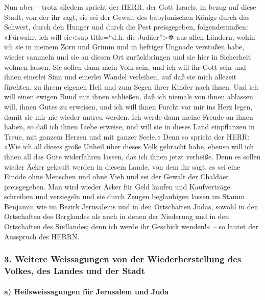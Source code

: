 Nun aber -- trotz alledem spricht der HERR, der Gott
Israels, in bezug auf diese Stadt, von der ihr sagt, sie sei der Gewalt
des babylonischen Königs durch das Schwert, durch den Hunger und durch
die Pest preisgegeben, folgendermaßen: »Fürwahr, ich will
sie\textless sup title=``d.h. die Judäer''\textgreater✲ aus allen
Ländern, wohin ich sie in meinem Zorn und Grimm und in heftiger Ungnade
verstoßen habe, wieder sammeln und sie an diesen Ort zurückbringen und
sie hier in Sicherheit wohnen lassen. Sie sollen dann
mein Volk sein, und ich will ihr Gott sein und ihnen
einerlei Sinn und einerlei Wandel verleihen, auf daß sie mich allezeit
fürchten, zu ihrem eigenen Heil und zum Segen ihrer Kinder nach ihnen.
Und ich will einen ewigen Bund mit ihnen schließen, daß
ich niemals von ihnen ablassen will, ihnen Gutes zu erweisen, und ich
will ihnen Furcht vor mir ins Herz legen, damit sie mir nie wieder
untreu werden. Ich werde dann meine Freude an ihnen
haben, so daß ich ihnen Liebe erweise, und will sie in dieses Land
einpflanzen in Treue, mit ganzem Herzen und mit ganzer Seele.«
Denn so spricht der HERR: »Wie ich all dieses große
Unheil über dieses Volk gebracht habe, ebenso will ich ihnen all das
Gute widerfahren lassen, das ich ihnen jetzt verheiße.
Denn es sollen wieder Äcker gekauft werden in diesem
Lande, von dem ihr sagt, es sei eine Einöde ohne Menschen und ohne Vieh
und sei der Gewalt der Chaldäer preisgegeben. Man wird
wieder Äcker für Geld kaufen und Kaufverträge schreiben und versiegeln
und sie durch Zeugen beglaubigen lassen im Stamm Benjamin wie im Bezirk
Jerusalems und in den Ortschaften Judas, sowohl in den Ortschaften des
Berglandes als auch in denen der Niederung und in den Ortschaften des
Südlandes; denn ich werde ihr Geschick wenden!« -- so lautet der
Ausspruch des HERRN.

\hypertarget{weitere-weissagungen-von-der-wiederherstellung-des-volkes-des-landes-und-der-stadt}{%
\subsubsection{3. Weitere Weissagungen von der Wiederherstellung des
Volkes, des Landes und der
Stadt}\label{weitere-weissagungen-von-der-wiederherstellung-des-volkes-des-landes-und-der-stadt}}

\hypertarget{a-heilsweissagungen-fuxfcr-jerusalem-und-juda}{%
\paragraph{a) Heilsweissagungen für Jerusalem und
Juda}\label{a-heilsweissagungen-fuxfcr-jerusalem-und-juda}}


